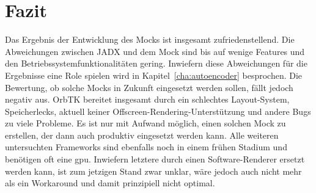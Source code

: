 \section{Fazit}
Das Ergebnis der Entwicklung des Mocks ist insgesamt zufriedenstellend. Die Abweichungen zwischen JADX und dem Mock sind bis auf wenige Features und den Betriebssystemfunktionalitäten gering. Inwiefern diese Abweichungen für die Ergebnisse eine Role spielen wird in Kapitel~\ref{cha:autoencoder} besprochen.
Die Bewertung, ob solche Mocks in Zukunft eingesetzt werden sollen, fällt jedoch negativ aus. OrbTK bereitet insgesamt durch ein schlechtes Layout-System, Speicherlecks, aktuell keiner Offscreen-Rendering-Unterstützung und andere Bugs zu viele Probleme. Es ist nur mit Aufwand möglich, einen solchen Mock zu erstellen, der dann auch produktiv eingesetzt werden kann. Alle weiteren untersuchten Frameworks sind ebenfalls noch in einem frühen Stadium und benötigen oft eine \gls{gpu}. Inwiefern letztere durch einen Software-Renderer ersetzt werden kann, ist zum jetzigen Stand zwar unklar, wäre jedoch auch nicht mehr als ein Workaround und damit prinzipiell nicht optimal.